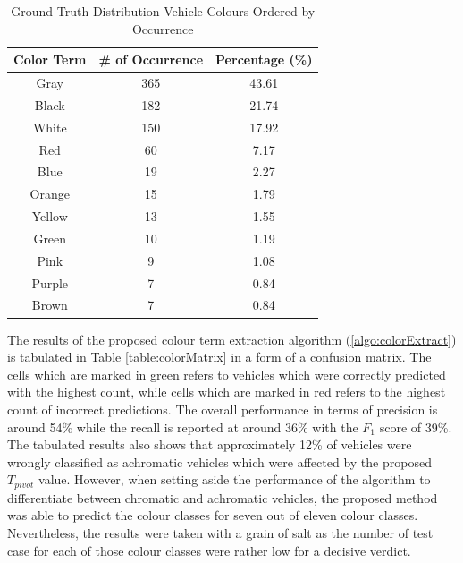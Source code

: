 \begin{table}[bht!]
\centering
\caption{Ground Truth Distribution Vehicle Colours Ordered by Occurrence}
\label{table:colorDist}
\begin{tabular}{ccc}
\toprule
Color Term & \# of Occurrence & Percentage (\%)   \\
\midrule
Gray       & 365       & 43.61  \\
Black      & 182       & 21.74  \\
White      & 150       & 17.92  \\
Red        & 60        & 7.17   \\
Blue       & 19        & 2.27   \\
Orange     & 15        & 1.79   \\
Yellow     & 13        & 1.55   \\
Green      & 10        & 1.19   \\
Pink       & 9         & 1.08   \\
Purple     & 7         & 0.84   \\
Brown      & 7         & 0.84   \\
\bottomrule
\end{tabular}
\end{table}




The results of the proposed colour term extraction algorithm (\ref{algo:colorExtract}) is tabulated in Table \ref{table:colorMatrix} in a form of a confusion matrix. The cells which are marked in green refers to vehicles which were correctly predicted with the highest count, while cells which are marked in red refers to the highest count of incorrect predictions. The overall performance in terms of precision is around 54\% while the recall is reported at around 36\% with the $F_1$ score of 39\%. The tabulated results also shows that approximately 12\% of vehicles were wrongly classified as achromatic vehicles which were affected by the proposed $T_{pivot}$ value. However, when setting aside the performance of the algorithm to differentiate between chromatic and achromatic vehicles, the proposed method was able to predict the colour classes for seven out of eleven colour classes. Nevertheless, the results were taken with a grain of salt as the number of test case for each of those colour classes were rather low for a decisive verdict. 

